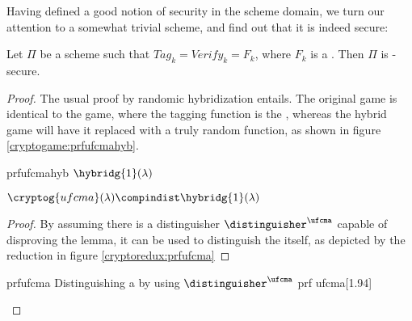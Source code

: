 Having defined a good notion of security in the \mac{} scheme domain, we turn our attention to a somewhat trivial scheme, and find out that it is indeed secure:

\begin{theorem}
    Let $\Pi$ be a \mac{} scheme such that $\textit{Tag}_k = \textit{Verify}_k = F_k$, where $F_k$ is a \prf. Then $\Pi$ is \ufcma-secure.
\end{theorem}

\begin{proof}
    The usual proof by randomic hybridization entails. The original game is identical to the \ufcma{} game, where the tagging function is the \prf, whereas the hybrid game will have it replaced with a truly random function, as shown in figure \ref{cryptogame:prfufcmahyb}.

    \begin{cryptogame}
        {prfufcmahyb}
        {$\hybridg{1}(\lambda)$}
        {}


        \cseqbeginloop
        \cseqendloop

        \cseqdelay


    \end{cryptogame}

    \begin{lemma}
        $\cryptog{ufcma}(\lambda) \compindist \hybridg{1}(\lambda)$  
    \end{lemma}

    \begin{proof}
        By assuming there is a distinguisher $\distinguisher^{\ufcma}$ capable of disproving the lemma, it can be used to distinguish the \prf{} itself, as depicted by the reduction in figure \ref{cryptoredux:prfufcma}
    \end{proof}

    \begin{cryptoredux}
        {prfufcma}
        {Distinguishing a \prf{} by using $\distinguisher^{\ufcma}$}
        {prf}
        {ufcma}[1.94]

    

\end{cryptoredux}
\end{proof}
